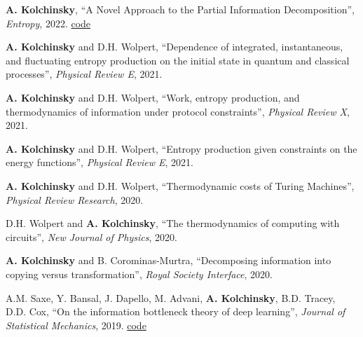 \textbf{A. Kolchinsky}, ``A Novel Approach to the Partial Information Decomposition'', \emph{Entropy}, 2022.
 \href{https://github.com/artemyk/redundancy}{code} 

\textbf{A. Kolchinsky} and D.H. Wolpert, ``Dependence of integrated, instantaneous, and fluctuating entropy production on the initial state in quantum and classical processes'', \emph{Physical Review E}, 2021.  

\textbf{A. Kolchinsky} and D.H. Wolpert, ``Work, entropy production, and thermodynamics of information under protocol constraints'', \emph{Physical Review X}, 2021.  

\textbf{A. Kolchinsky} and D.H. Wolpert, ``Entropy production given constraints on the energy functions'', \emph{Physical Review E}, 2021.  

\textbf{A. Kolchinsky} and D.H. Wolpert, ``Thermodynamic costs of Turing Machines'', \emph{Physical Review Research}, 2020. %
 

D.H. Wolpert and \textbf{A. Kolchinsky}, ``The thermodynamics of computing with circuits'', \emph{New Journal of Physics}, 2020.  %
 

\textbf{A. Kolchinsky} and B. Corominas-Murtra, ``Decomposing information into copying versus transformation'', 
\emph{Royal Society Interface}, 2020. %
 

A.M. Saxe, Y. Bansal, J. Dapello, M. Advani, \textbf{A. Kolchinsky}, B.D. Tracey, D.D. Cox, 
``On the information bottleneck theory of deep learning'',  \emph{Journal of Statistical Mechanics}, 2019. 
\href{https://github.com/artemyk/ibsgd/tree/iclr2018}{code}  %

